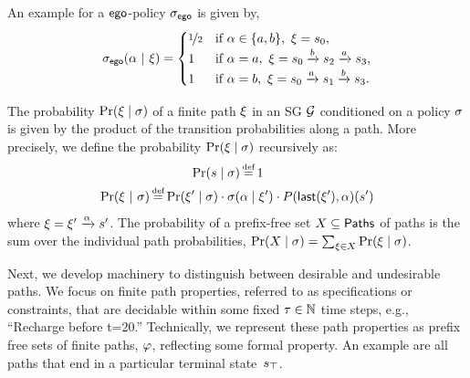 {{{%


\begin{example}
  An example for a $\mathsf{ego}$-policy ${\sigma_{\mathsf{ego}}}$ is given
  by,
  \begin{equation*}
    {\sigma_{\mathsf{ego}}}(\alpha~|~\xi) =
    \begin{cases}
      \nicefrac{1}{2} & \text{if } \alpha \in \{ a,b \}, ~\xi = s_0,\\
      1 & \text{if } \alpha = a,~\xi = s_0\xrightarrow{b}s_2 \xrightarrow{a} s_3,\\
      1 & \text{if } \alpha = b,~\xi = s_0\xrightarrow{a}s_1\xrightarrow{b}s_3.\\
    \end{cases}
  \end{equation*}
\end{example}


The probability $\Pr(\xi \mid \sigma)$ of a finite path $\xi$ in an SG $\mathcal{G}$ conditioned on a policy $\sigma$ is given by the product of the transition probabilities along a path. 
More precisely, we define the probability $\Pr(\xi \mid \sigma)$ recursively as:
\begin{equation}
  \begin{split}
    \Pr(s \mid \sched) &\eqdef 1\\
    \Pr(\path~|~\sigma) \eqdef \Pr(\path'\mid\sched)\cdot \sched(&\act\mid\path') \cdot P(\last{\path'},\act)(s')
  \end{split}
\end{equation}
where $\xi =  \xi' \xrightarrow{\alpha} s'$.
The probability of a prefix-free set $X \subseteq \mathsf{Paths}^{}_{}$  of paths is the sum over the individual path probabilities, $\Pr(X \mid \sigma) = \sum_{\xi \in X} \Pr(\xi \mid \sigma )$.

Next, we develop machinery to distinguish between desirable and
undesirable paths. We focus on finite path properties,
referred to as specifications or constraints, that are decidable
within some fixed $\tau \in \mathbb{N}$ time steps, e.g., ``Recharge before
t=20.'' Technically, we represent these path properties as prefix free
sets of finite paths, $\varphi$, reflecting some formal
property\footnotemark. An example are all paths that end in a particular terminal state~$s_{\top}$.

}}}
